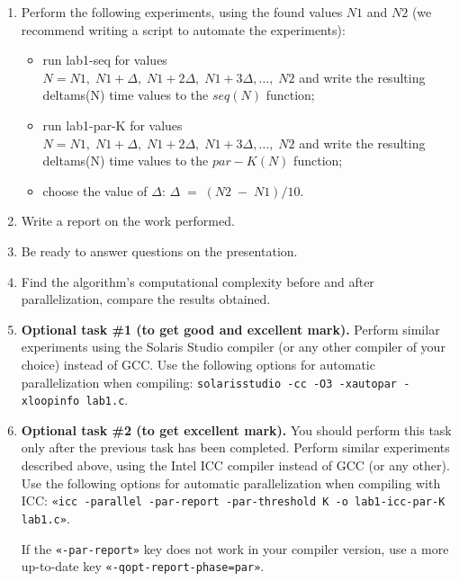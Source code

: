 {\begin{enumerate}
		\item Perform the following experiments, using the found values $ N1 $ and $ N2 $ (we recommend writing a script to automate the experiments):
			\begin{itemize}
				\item run lab1-seq for values \\$N={N1,\;N1+\Delta,\;N1+2\Delta,\;N1+3\Delta,…,\;N2}$ and write the resulting  delta\textunderscore ms(N) time values to the $seq(N)$ function;
				\item run lab1-par-K for values \\$N={N1,\;N1+\Delta,\;N1+2\Delta,\;N1+3\Delta,…,\;N2}$ and write the resulting delta\textunderscore ms(N) time values to the $par-K(N)$ function;
				\item choose the value of $\Delta$: $\Delta\;=\;(N2\;-\;N1)/10$.
			\end{itemize}
		\item Write a report on the work performed.
		\item Be ready to answer questions on the presentation.
		\item Find the algorithm's computational complexity before and after parallelization, compare the results obtained.
		\sloppy
		\item\textbf{Optional task \#1 (to get good and excellent mark).} Perform similar experiments using the Solaris Studio compiler (or any other compiler of your choice) instead of GCC. Use the following options for automatic parallelization when compiling: {\small \texttt{solarisstudio -cc -O3 -xautopar -xloopinfo lab1.c}}.
 		\item\textbf{Optional task \#2 (to get excellent mark).} You should perform this task only after the previous task has been completed. Perform similar experiments described above, using the Intel ICC compiler instead of GCC (or any other). Use the following options for automatic parallelization when compiling with ICC: \verb+«icc -parallel -par-report -par-threshold K -o lab1-icc-par-K lab1.c»+.
			\par If the \verb+«-par-report»+ key does not work in your compiler version, use a more up-to-date key \verb+«-qopt-report-phase=par»+.
	\end{enumerate}
	
}